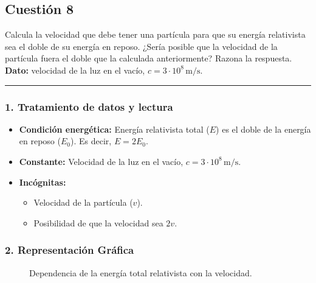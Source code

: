 \subsection{Cuestión 8}
\label{subsec:C8_2022_jul_ord}

\begin{cajaenunciado}
Calcula la velocidad que debe tener una partícula para que su energía relativista sea el doble de su energía en reposo. ¿Sería posible que la velocidad de la partícula fuera el doble que la calculada anteriormente? Razona la respuesta.
\textbf{Dato:} velocidad de la luz en el vacío, $c=3\cdot10^{8}\,\text{m/s}$.
\end{cajaenunciado}
\hrule

\subsubsection*{1. Tratamiento de datos y lectura}
\begin{itemize}
    \item \textbf{Condición energética:} Energía relativista total ($E$) es el doble de la energía en reposo ($E_0$). Es decir, $E = 2E_0$.
    \item \textbf{Constante:} Velocidad de la luz en el vacío, $c = 3 \cdot 10^8\,\text{m/s}$.
    \item \textbf{Incógnitas:}
    \begin{itemize}
        \item Velocidad de la partícula ($v$).
        \item Posibilidad de que la velocidad sea $2v$.
    \end{itemize}
\end{itemize}

\subsubsection*{2. Representación Gráfica}
\begin{figure}[H]
    \centering
    \caption{Dependencia de la energía total relativista con la velocidad.}
\end{figure}

